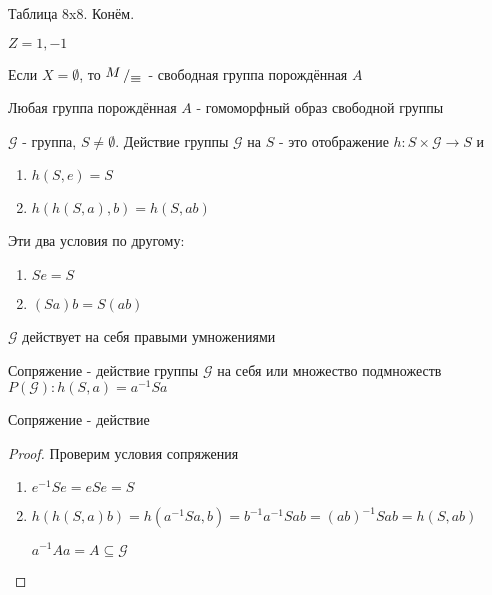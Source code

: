 \documentclass[../main/document.tex]{subfiles}
\begin{document}
\begin{exm}
Таблица 8x8. Конём.
\end{exm}

\begin{exm}
$Z=1,-1$
\end{exm}

\begin{exm}
\end{exm}

\begin{exm}
\end{exm}

\begin{exm}
\end{exm}

\begin{exm}
\end{exm}

\begin{dfn}
Если $X= \emptyset$, то $\bigslant{M}{\equiv}$ - свободная группа порождённая $A$
\end{dfn}

\begin{cnsq}
Любая группа порождённая $A$ - гомоморфный образ свободной группы
\end{cnsq}

\begin{dfn}
$\mathcal{G}$ - группа, $S\neq \emptyset$. Действие группы $\mathcal{G}$ на $S$ - это отображение $h:S\times \mathcal{G}\rightarrow S$ и
\begin{enumerate}
\item $h(S,e)=S$
\item $h(h(S,a),b)=h(S,ab)$
\end{enumerate}
Эти два условия по другому:
\begin{enumerate}
\item $Se=S$
\item $(Sa)b=S(ab)$
\end{enumerate}
\end{dfn}

\begin{exm}
$\mathcal{G}$ действует на себя правыми умножениями
\end{exm}

\begin{dfn}
Сопряжение - действие группы $\mathcal{G}$ на себя или множество подмножеств $P(\mathcal{G}):h(S,a)=a^{-1}Sa$
\end{dfn}

\begin{thm}
Сопряжение - действие
\begin{proof}
Проверим условия сопряжения
\begin{enumerate}
\item $e^{-1}Se=eSe=S$
\item $h(h(S,a)b)=h(a^{-1}Sa,b)=b^{-1}a^{-1}Sab=(ab)^{-1}Sab=h(S,ab)$

$a^{-1}Aa=A\subseteq \mathcal{G}$
\end{enumerate}
\end{proof}
\end{thm}
\end{document}
